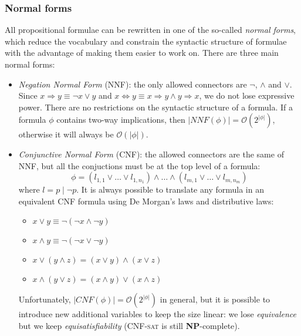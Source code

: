 \documentclass{article}
\theoremstyle{example}
\theoremstyle{remark}
\renewcommand{\implies}{\Rightarrow}
\renewcommand{\iff}{\Leftrightarrow}
\newcommand{\BigO}{\mathcal{O}}
\newcommand{\abs}[1]{\left\lvert{#1}\right\rvert}
\begin{document}
\subsubsection{Normal forms}
All propositional formulae can be rewritten in one of the so-called \emph{normal forms}, which
reduce the vocabulary and constrain the syntactic structure of formulae with the advantage of
making them easier to work on.
There are three main normal forms:
\begin{itemize}
	\item \emph{Negation Normal Form} (NNF): the only allowed connectors are \(\neg \), \(\land \) and
	      \(\lor \). Since \(x \implies y \equiv \neg x \lor y\) and
	      \(x \iff y \equiv x \implies y \land y \implies x\), we do not lose expressive power.
	      There are no restrictions on the syntactic structure of a formula.
	      If a formula \(\phi \) contains two-way implications, then \(\abs{NNF\left(\phi\right)} =
	      \BigO\left(2^{\abs{\phi}}\right)\),
	      otherwise it will always be \(\BigO\left(\abs{\phi}\right)\).
	\item \emph{Conjunctive Normal Form} (CNF): the allowed connectors are the same of NNF, but
	      all the conjuctions must be at the top level of a formula:
	      \[\phi = \left(l_{1,1} \lor \dots \lor l_{1,n_1}\right) \land \dots \land \left(l_{m,1}
		      \lor \dots \lor l_{m,n_m}\right)\]
	      where \(l = p \mid \neg p\).
	      It is always possible to translate any formula in an equivalent CNF formula using
	      De Morgan's laws and distributive laws:
	      \begin{itemize}
		      \renewcommand\labelitemii{\(\circ \)}
		      \item \(x \lor y \equiv \neg{\left(\neg x \land \neg y\right)}\)
		      \item \(x \land y \equiv \neg{\left(\neg x \lor \neg y\right)}\)
		      \item \(x \lor \left(y \land z\right) = \left(x \lor y\right) \land \left(x \lor
		            z\right)\)
		      \item \(x \land \left(y \lor z\right) = \left(x \land y\right) \lor \left(x \land
		            z\right)\)
	      \end{itemize}
	      Unfortunately, \(\abs{CNF\left(\phi\right)} = \BigO\left(2^{\abs{\phi}}\right)\) in general,
	      but it is possible to introduce new additional variables to keep the size linear: we lose
	      \emph{equivalence} but we keep \emph{equisatisfiability} (\textsc{CNF-sat} is still
	      \textbf{NP}-complete).

\end{itemize}
\end{document}
